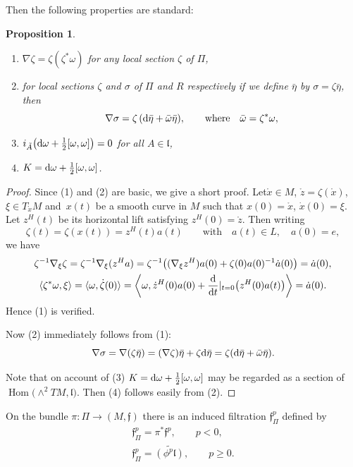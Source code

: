 \documentclass[10pt,a4paper]{amsart}
\newcommand{\f}{\mathfrak f}
\newcommand{\lf}{\mathfrak l}
\newcommand{\Hom}{\operatorname{Hom}}
\newtheorem{prop}[thm]{Proposition}
\numberwithin{equation}{section}
\begin{document}
Then the following properties are standard:
\begin{prop}\label{stProp}\quad
\begin{enumerate}\itemsep=0pt
\item[$(1)$] $\nabla \zeta = \zeta (\zeta^*\omega)$ for any local section $\zeta$ of $\Pi$,
\item[$(2)$] for local sections $\zeta$ and $\sigma$ of $\Pi$ and $R$ respectively if we define $\bar\eta$ by $\sigma = \zeta\bar\eta$, then
\[
\nabla \sigma = \zeta \left({\rm d}\bar\eta +\bar\omega\bar\eta\right)\!,\qquad\text{where} \quad\bar\omega=\zeta^*\omega,
\]
\item[$(3)$] $i_{\tilde A}\big({\rm d}\omega + \tfrac{1}{2}[\omega,\omega]\big)=0$ for all $A\in\lf$,
\item[$(4)$] $K = {\rm d}\omega + \tfrac{1}{2}[\omega,\omega]$.
\end{enumerate}
\end{prop}
\begin{proof}
	Since (1) and (2) are basic, we give a short proof. Let$\mathring{x}\in M$, $\mathring{z}=\zeta(\mathring{x})$, $\xi\in T_{\mathring{x}}M$ and~$x(t)$ be a smooth curve in $M$ such that $x(0)=\mathring{x}$, $\dot x(0)=\xi$. Let $z^H(t)$ be its horizontal lift satisfying $z^H(0)=\mathring{z}$. Then writing
\[
\zeta(t) = \zeta(x(t)) = z^H(t) a(t)\qquad\text{with}\quad a(t)\in L,\quad a(0)=e,
\]
we have
\begin{gather*}
\zeta^{-1}\nabla_{\xi}\zeta =\zeta^{-1}\nabla_{\xi}(z^Ha)
= \zeta^{-1}\big((\nabla_\xi z^H)a(0)+\zeta(0)a(0)^{-1}\dot a(0)\big)=\dot a(0),
\\
\langle \zeta^*\omega, \xi\rangle = \langle \omega, \dot\zeta(0)\rangle
= \bigg\langle \omega, \dot z^H(0)a(0)+\frac{\rm d}{{\rm d}t}|_{t=0}\big(z^H(0)a(t)\big)\bigg\rangle = \dot a(0).
\end{gather*}
Hence (1) is verified.
	
	Now (2) immediately follows from (1):
	\[
		\nabla \sigma = \nabla (\zeta\bar\eta) = (\nabla\zeta) \bar\eta +\zeta {\rm d}\bar\eta = \zeta({\rm d}\bar\eta+\bar\omega\bar\eta).
	\]
	
	Note that on account of (3) $K={\rm d}\omega+\tfrac{1}{2}[\omega,\omega]$ may be regarded as a section of $\Hom\big({\wedge}^2 TM,\lf\big)$. Then (4) follows easily from (2).
	\end{proof}
	
	On the bundle $\pi\colon \Pi\to (M,\f)$ there is an induced filtration $\f^p_{\Pi}$ defined by
	\begin{gather*}
		\f^p_{\Pi} = \pi^*\f^p,\qquad p<0, \\
		\f^p_{\Pi} = \widetilde{(\phi^p\lf)},\qquad p\ge 0.
	\end{gather*}
	
\end{document}
